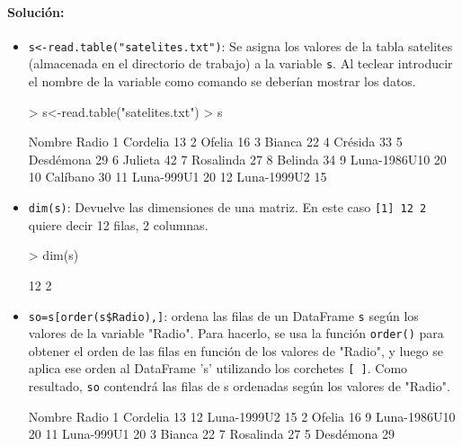 \documentclass[a4paper, 12pt]{article}
\begin{document}
	\paragraph{Solución:}
	\begin{itemize}
		\item \texttt{s<-read.table(\string"satelites.txt")}: Se asigna los valores de la tabla satelites (almacenada en el directorio de trabajo) a la variable \texttt{s}. Al teclear introducir el nombre de la variable como comando se deberían mostrar los datos.
\begin{Schunk}
\begin{Sinput}
> s<-read.table("satelites.txt")
> s
\end{Sinput}
\begin{Soutput}
         Nombre Radio
1      Cordelia    13
2        Ofelia    16
3        Bianca    22
4       Crésida    33
5     Desdémona    29
6       Julieta    42
7     Rosalinda    27
8       Belinda    34
9  Luna-1986U10    20
10     Calíbano    30
11   Luna-999U1    20
12  Luna-1999U2    15
\end{Soutput}
\end{Schunk}
		\item \texttt{dim(s)}: Devuelve las dimensiones de una matriz. En este caso \texttt{[1] 12 2} quiere decir 12 filas, 2 columnas.
\begin{Schunk}
\begin{Sinput}
> dim(s)
\end{Sinput}
\begin{Soutput}
[1] 12  2
\end{Soutput}
\end{Schunk}
		\item \texttt{so=s[order(s\$Radio),]}: ordena las filas de un DataFrame \texttt{s} según los valores de la variable "Radio". Para hacerlo, se usa la función \texttt{order()} para obtener el orden de las filas en función de los valores de "Radio", y luego se aplica ese orden al DataFrame 's' utilizando los corchetes \texttt{[ ]}. Como resultado, \texttt{so} contendrá las filas de s ordenadas según los valores de "Radio".
\begin{Schunk}
\begin{Soutput}
         Nombre Radio
1      Cordelia    13
12  Luna-1999U2    15
2        Ofelia    16
9  Luna-1986U10    20
11   Luna-999U1    20
3        Bianca    22
7     Rosalinda    27
5     Desdémona    29

\end{Soutput}
\end{Schunk}
\end{itemize}
\end{document}
